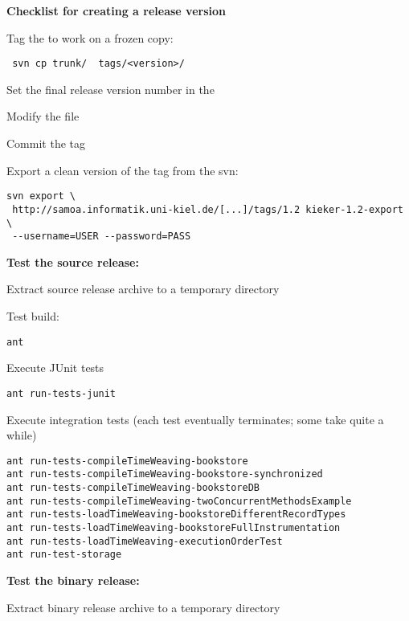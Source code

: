 \textbf{Checklist for creating a release version}


\begin{compactenum}
\item Tag the  to work on a frozen copy:
\setBashListing
\begin{lstlisting}
 svn cp trunk/  tags/<version>/
\end{lstlisting}
\item Set the final release version number in the 
\item Modify the  file
\item Commit the tag
\item Export a clean version of the tag from the svn:
\setBashListing
\begin{lstlisting}
svn export \
 http://samoa.informatik.uni-kiel.de/[...]/tags/1.2 kieker-1.2-export \
 --username=USER --password=PASS
\end{lstlisting}

\item \textbf{Test the source release:}
\begin{compactenum}
\item Extract source release archive to a temporary directory
\item Test build:
\setBashListing
\begin{lstlisting}
ant
\end{lstlisting}
\item Execute JUnit tests
\setBashListing
\begin{lstlisting}
ant run-tests-junit
\end{lstlisting}
\item Execute integration tests (each test eventually terminates; some take quite a while)
\setBashListing
\begin{lstlisting}
ant run-tests-compileTimeWeaving-bookstore
ant run-tests-compileTimeWeaving-bookstore-synchronized
ant run-tests-compileTimeWeaving-bookstoreDB
ant run-tests-compileTimeWeaving-twoConcurrentMethodsExample
ant run-tests-loadTimeWeaving-bookstoreDifferentRecordTypes
ant run-tests-loadTimeWeaving-bookstoreFullInstrumentation
ant run-tests-loadTimeWeaving-executionOrderTest
ant run-test-storage
\end{lstlisting}
\end{compactenum}

\item \textbf{Test the binary release:}
\begin{compactenum}
\item Extract binary release archive to a temporary directory


\end{compactenum}
\end{compactenum}
